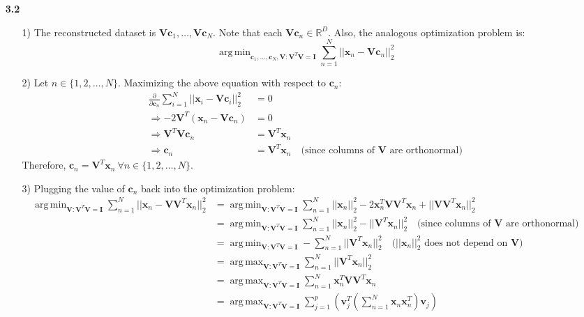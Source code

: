 \documentclass{article}
\newcommand{\mbi}[1]{\boldsymbol{#1}}
\DeclareMathOperator*{\argmin}{arg\,min}
\DeclareMathOperator*{\argmax}{arg\,max}
\begin{document}
\begin{itemize}
    \item[\textbf{3.2}]
    \begin{itemize}
      \item[1)] The reconstructed dataset is $\mathbf{V}\mbi{c}_1, \ldots, \mathbf{V}\mbi{c}_N$.
      Note that each $\mathbf{V}\mbi{c}_n \in \mathbb{R}^D$.
      Also, the analogous optimization problem is:
      \[ \argmin_{\mbi{c}_1, \ldots, \mbi{c}_N, \mathbf{V}: \mathbf{V}^T \mathbf{V} = \mathbf{I}} \sum_{n=1}^N ||\mbi{x}_n - \mathbf{V}\mbi{c}_n||_2^2 \]

      \item[2)] Let $n \in \{1, 2, \ldots, N\}$.
      Maximizing the above equation with respect to $\mbi{c}_n$:
      \begin{align*}
        \frac{\partial}{\partial \mbi{c}_n} \sum_{i=1}^N ||\mbi{x}_i - \mathbf{V}\mbi{c}_i||_2^2 &= 0 \\
        \Rightarrow -2 \mathbf{V}^T (\mbi{x}_n - \mathbf{V}\mbi{c}_n) &= 0 \\
        \Rightarrow \mathbf{V}^T \mathbf{V} \mbi{c}_n &= \mathbf{V}^T \mbi{x}_n \\
        \Rightarrow \mbi{c}_n &= \mathbf{V}^T \mbi{x}_n \quad \text{(since columns of $\mathbf{V}$ are orthonormal)}
      \end{align*}
      Therefore, $\mbi{c}_n = \mathbf{V}^T \mbi{x}_n ~ \forall n \in \{1, 2, \ldots, N\}$.

      \item[3)] Plugging the value of $\mbi{c}_n$ back into the optimization problem:
      \begin{align*}
        \argmin_{\mathbf{V}: \mathbf{V}^T \mathbf{V} = \mathbf{I}} \sum_{n=1}^N ||\mbi{x}_n - \mathbf{V} \mathbf{V}^T \mbi{x}_n||_2^2 &= \argmin_{\mathbf{V}: \mathbf{V}^T \mathbf{V} = \mathbf{I}} \sum_{n=1}^N ||\mbi{x}_n||_2^2 - 2 \mbi{x}_n^T \mathbf{V} \mathbf{V}^T \mbi{x}_n + ||\mathbf{V} \mathbf{V}^T \mbi{x}_n||_2^2 \\
        &= \argmin_{\mathbf{V}: \mathbf{V}^T \mathbf{V} = \mathbf{I}} \sum_{n=1}^N ||\mbi{x}_n||_2^2 - ||\mathbf{V}^T \mbi{x}_n||_2^2 \quad \text{(since columns of $\mathbf{V}$ are orthonormal)} \\
        &= \argmin_{\mathbf{V}: \mathbf{V}^T \mathbf{V} = \mathbf{I}} - \sum_{n=1}^N ||\mathbf{V}^T \mbi{x}_n||_2^2 \quad \text{($||\mbi{x}_n||_2^2$ does not depend on $\mathbf{V}$)} \\
        &= \argmax_{\mathbf{V}: \mathbf{V}^T \mathbf{V} = \mathbf{I}} \sum_{n=1}^N ||\mathbf{V}^T \mbi{x}_n||_2^2 \\
        &= \argmax_{\mathbf{V}: \mathbf{V}^T \mathbf{V} = \mathbf{I}} \sum_{n=1}^N \mbi{x}_n^T \mathbf{V} \mathbf{V}^T \mbi{x}_n \\
        &= \argmax_{\mathbf{V}: \mathbf{V}^T \mathbf{V} = \mathbf{I}} \sum_{j=1}^p \left( \mbi{v}_j^T \left( \sum_{n=1}^N \mbi{x}_n \mbi{x}_n^T \right) \mbi{v}_j \right) \\
      \end{align*}
    \end{itemize}
  \end{itemize}
\end{document}
